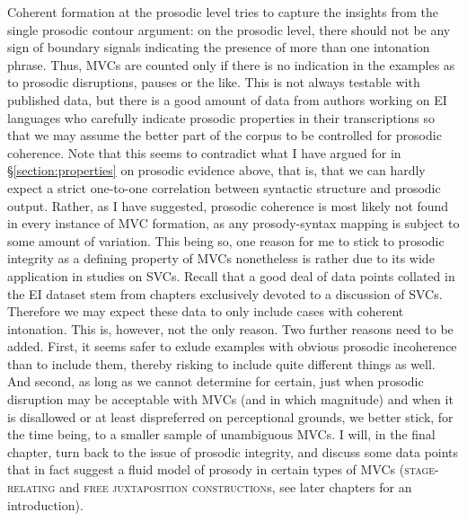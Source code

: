 Coherent formation at the prosodic level tries to capture the insights from the single prosodic contour argument: on the prosodic level, there should not be any sign of boundary signals indicating the presence of more than one intonation phrase. Thus, MVCs are counted only if there is no indication in the examples as to prosodic disruptions, pauses or the like. This is not always testable with published data, but there is a good amount of data from authors working on EI languages who carefully indicate prosodic properties in their transcriptions so that we may assume the better part of the corpus to be controlled for prosodic coherence. Note that this seems to contradict what I have argued for in §\ref{section:properties} on prosodic evidence above, that is, that we can hardly expect a strict one-to-one correlation between syntactic structure and prosodic output. Rather, as I have suggested, prosodic coherence is most likely not found in every instance of MVC formation, as any prosody-syntax mapping is subject to some amount of variation. This being so, one reason for me to stick to prosodic integrity as a defining property of MVCs nonetheless is rather due to its wide application in studies on SVCs. Recall that a good deal of data points collated in the EI dataset stem from chapters exclusively devoted to a discussion of SVCs. Therefore we may expect these data to only include cases with coherent intonation. This is, however, not the only reason. Two further reasons need to be added. First, it seems safer to exlude examples with obvious prosodic incoherence than to include them, thereby risking to include quite different things as well. And second, as long as we cannot determine for certain, just when prosodic disruption may be acceptable with MVCs (and in which magnitude) and when it is disallowed or at least dispreferred on perceptional grounds, we better stick, for the time being, to a smaller sample of unambiguous MVCs. I will, in the final chapter, turn back to the issue of prosodic integrity, and discuss some data points that in fact suggest a fluid model of prosody in certain types of MVCs (\textsc{stage-relating} and \textsc{free juxtaposition construction}s, see later chapters for an introduction).

